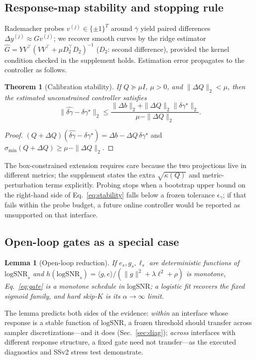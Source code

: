 \documentclass[letterpaper]{article}
\newcommand{\lsnr}{\mathrm{logSNR}}
\newtheorem{theorem}{Theorem}
\newtheorem{lemma}{Lemma}
\begin{document}
\subsection{Response-map stability and stopping rule}
Rademacher probes $v^{(j)}\in\{\pm1\}^T$ around $\bar\gamma$ yield paired
differences $\Delta y^{(j)}\approx Gv^{(j)}$; we recover smooth curves by
the ridge estimator
$\widehat G=YV^\top(VV^\top+\mu D_2^\top D_2)^{-1}$
($D_2$: second difference), provided the kernel condition checked in
the supplement holds. Estimation
error propagates to the controller as follows.
\begin{theorem}[Calibration stability]\label{thm:stability}
If $Q\succeq\mu I$, $\mu>0$, and $\|\Delta Q\|_2<\mu$, then the estimated
unconstrained controller satisfies
\begin{equation}
\|\widehat{\delta\gamma}-\delta\gamma^\star\|_2\le
\frac{\|\Delta b\|_2+\|\Delta Q\|_2\|\delta\gamma^\star\|_2}
{\mu-\|\Delta Q\|_2}.
\label{eq:stability}
\end{equation}
\end{theorem}
\begin{proof}
$(Q+\Delta Q)(\widehat{\delta\gamma}-\delta\gamma^\star)=\Delta b-\Delta
Q\,\delta\gamma^\star$ and
$\sigma_{\min}(Q+\Delta Q)\ge\mu-\|\Delta Q\|_2$.
\end{proof}
The box-constrained extension requires care because the two projections
live in different metrics; the supplement states the extra
$\sqrt{\kappa(Q)}$ and metric-perturbation terms explicitly. Probing stops
when a bootstrap upper bound on the right-hand side of
Eq.~\eqref{eq:stability} falls below a frozen tolerance
$\epsilon_\gamma$; if that fails within the probe budget, a future online
controller would be reported as unsupported on that interface.

\subsection{Open-loop gates as a special case}
\begin{lemma}[Open-loop reduction]\label{lem:openloop}
If $e_s,g_s,\ell_s$ are deterministic functions of $\lsnr_s$ and
$h(\lsnr_s)=\langle g,e\rangle/(\|g\|^2+\lambda\ell^2+\rho)$ is monotone,
Eq.~\eqref{eq:gate} is a monotone schedule in $\lsnr$; a logistic fit
recovers the fixed sigmoid family, and hard skip-$K$ is its
$\alpha\to\infty$ limit.
\end{lemma}
The lemma predicts both sides of the evidence: \emph{within} an interface
whose response is a stable function of $\lsnr$, a frozen threshold should
transfer across sampler discretizations---and it does
(Sec.~\ref{sec:diag}); \emph{across} interfaces with different response
structure, a fixed gate need not transfer---as the executed diagnostics and
SSv2 stress test demonstrate.
\end{document}
